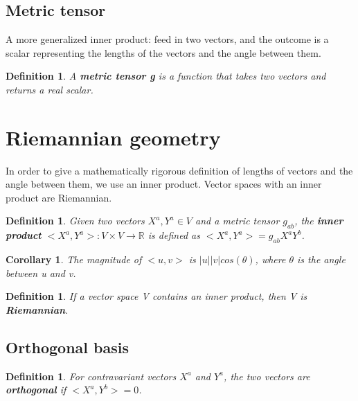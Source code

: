\documentclass{book}
\newtheorem{defn}[equation]{Definition}
\newtheorem{coro}[equation]{Corollary}
\begin{document}
\subsection{Metric tensor}
A more generalized inner product: feed in two vectors, and the outcome is a scalar representing the lengths of the vectors and the angle between them. 

\begin{defn}
	A \textbf{metric tensor g} is a function that takes two vectors and returns a real scalar. 
\end{defn}


\section{Riemannian geometry}
In order to give a mathematically rigorous definition of lengths of vectors and the angle between them, we use an inner product. Vector spaces with an inner product are Riemannian.

\begin{defn}
	Given two vectors $X^a,Y^a \in V$ and a metric tensor $g_{ab}$, the \textbf{inner product} $<X^a,Y^a> : V \times V \to \mathbb{R}$ is defined as $<X^a,Y^a> = g_{ab}X^aY^b$. 
\end{defn}

\begin{coro}
	The magnitude of $<u,v>$ is $|u||v|cos(\theta)$, where $\theta$ is the angle between u and v. 
\end{coro}

\begin{defn}
	If a vector space V contains an inner product, then V is \textbf{Riemannian}.
	\end{defn}



\subsection{Orthogonal basis}

\begin{defn}
	For contravariant vectors $X^a$ and $Y^a$, the two vectors are \textbf{orthogonal} if $<X^a,Y^b> = 0$. 
\end{defn}
\end{document}
